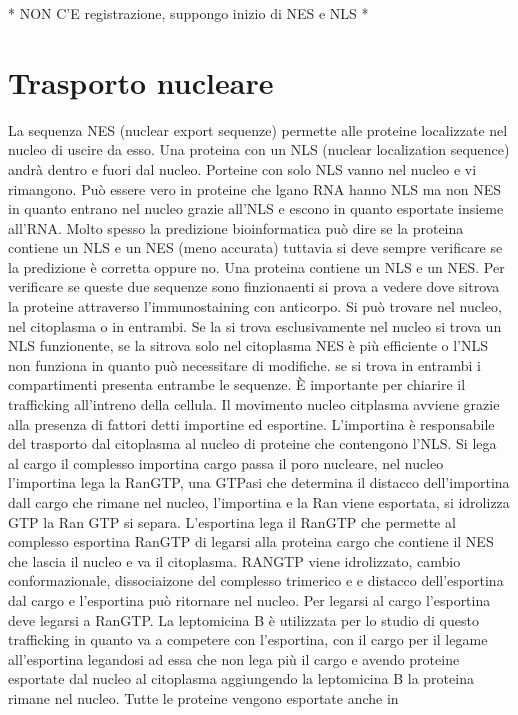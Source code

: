 * NON C'E registrazione, suppongo inizio di NES e NLS *

\section{Trasporto nucleare}
La sequenza NES (nuclear export sequenze) permette alle proteine localizzate nel nucleo di uscire da esso. Una proteina con un NLS (nuclear localization sequence) andr\`a dentro e 
fuori dal nucleo. Porteine con solo NLS vanno nel nucleo e vi rimangono. Pu\`o essere vero in proteine che lgano RNA hanno NLS ma non NES in quanto entrano nel nucleo grazie all'NLS
e escono in quanto esportate insieme all'RNA. Molto spesso la predizione bioinformatica pu\`o dire se la proteina contiene un NLS e un NES (meno accurata) tuttavia si deve sempre 
verificare se la predizione \`e corretta oppure no. Una proteina contiene un NLS e un NES. Per verificare se queste due sequenze sono finzionaenti si prova a vedere dove sitrova la 
proteine attraverso l'immunostaining con anticorpo. Si pu\`o trovare nel nucleo, nel citoplasma o in entrambi. Se la si trova esclusivamente nel nucleo si trova un NLS funzionente, se la 
sitrova solo nel citoplasma NES \`e pi\`u efficiente o l'NLS non funziona in quanto pu\`o necessitare di modifiche. se si trova in entrambi i compartimenti presenta entrambe le sequenze.
\`E importante per chiarire il trafficking all'intreno della cellula. Il movimento nucleo citplasma avviene grazie alla presenza di fattori detti importine ed esportine. L'importina \`e
responsabile del trasporto dal citoplasma al nucleo di proteine che contengono l'NLS. Si lega al cargo il complesso importina cargo passa il poro nucleare, nel nucleo l'importina lega 
la RanGTP, una GTPasi che determina il distacco dell'importina dall cargo che rimane nel nucleo, l'importina e la Ran viene esportata, si idrolizza GTP la Ran GTP si separa. L'esportina
lega il RanGTP che permette al complesso esportina RanGTP di legarsi alla proteina cargo che contiene il NES che lascia il nucleo e va il citoplasma. RANGTP viene idrolizzato, cambio
conformazionale, dissociaizone del complesso trimerico e e distacco dell'esportina dal cargo e l'esportina pu\`o ritornare nel nucleo. Per legarsi al cargo l'esportina deve legarsi a 
RanGTP. La leptomicina B \`e utilizzata per lo studio di questo trafficking in quanto va a competere con l'esportina, con il cargo per il legame all'esportina legandosi ad essa che non
lega pi\`u il cargo e avendo proteine esportate dal nucleo al citoplasma aggiungendo la leptomicina B la proteina rimane nel nucleo. Tutte le proteine vengono esportate anche in 

